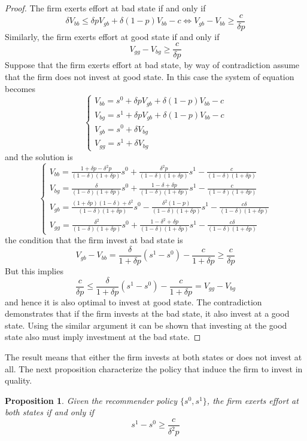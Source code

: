 \documentclass[a4paper]{article}
\newtheorem{proposition}[theorem]{Proposition}
\begin{document}
\begin{proof}
	
	The firm exerts effort at bad state if and only if $$\delta V_{bb} \le \delta p V_{gb} + \delta (1-p)V_{bb} - c \iff V_{gb} - V_{bb} \ge \frac{c}{\delta p}$$
	Similarly, the firm exerts effort at good state if and only if $$V_{gg} - V_{bg} \ge \frac{c}{\delta p}$$ Suppose that the firm exerts effort at bad state, by way of contradiction assume that the firm does not invest at good state. In this case the system of equation becomes
	$$	\begin{cases}
	V_{bb} = s^0 + \delta p V_{gb} + \delta (1-p)V_{bb} - c\\
	V_{bg} = s^1 + \delta p V_{gb} + \delta (1-p)V_{bb} - c\\
	V_{gb} = s^0 + \delta V_{bg}\\
	V_{gg} = s^1 + \delta V_{bg}
	\end{cases}$$ and the solution is $$\begin{cases}
	V_{bb} = \frac{1+\delta p - \delta^2p}{(1-\delta)(1+\delta p)}s^0 + \frac{\delta^2 p}{(1-\delta)(1+\delta p)}s^1 - \frac{c}{(1-\delta)(1+\delta p)}\\
	V_{bg} = \frac{\delta}{(1-\delta)(1+\delta p)}s^0 + \frac{1-\delta + \delta p}{(1-\delta)(1+\delta p)}s^1 - \frac{c}{(1-\delta)(1+\delta p)}\\
	V_{gb} = \frac{(1+\delta p)(1-\delta)+\delta^2}{(1-\delta)(1+\delta p)}s^0 - \frac{\delta^2(1-p)}{(1-\delta)(1+\delta p)}s^1 - \frac{c \delta}{(1-\delta)(1+\delta p)}\\
	V_{gg} = \frac{\delta^2}{(1-\delta)(1+\delta p)}s^0 + \frac{1 - \delta^2 + \delta p}{(1-\delta)(1+\delta p)}s^1 - \frac{c\delta}{(1-\delta)(1+\delta p)}
	\end{cases}$$
	the condition that the firm invest at bad state is
	$$V_{gb} - V_{bb} = \frac{\delta}{1+\delta p}(s^1 - s^0) - \frac{c}{1+\delta p} \ge \frac{c}{\delta p}$$
	But this implies
	$$\frac{c}{\delta p} \le \frac{\delta}{1 + \delta p}(s^1 - s^0) - \frac{c}{1 + \delta p} = V_{gg} - V_{bg}$$ and hence it is also optimal to invest at good state. The contradiction demonstrates that if the firm invests at the bad state, it also invest at a good state. Using the similar argument it can be shown that investing at the good state also must imply investment at the bad state.
\end{proof}
The result means that either the firm invests at both states or does not invest at all.
The next proposition characterize the policy that induce the firm to invest in quality.
\begin{proposition}\label{prop1}
	Given the recommender policy $\{s^0, s^1\}$, the firm exerts effort at both states if and only if $$s^1 - s^0 \ge \frac{c}{\delta^2 p}$$
\end{proposition}
\end{document}
